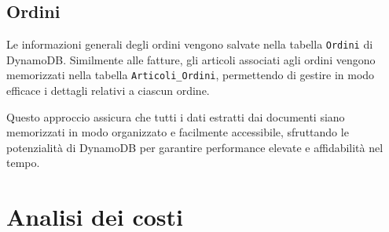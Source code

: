\subsection{Ordini}
Le informazioni generali degli ordini vengono salvate nella tabella \texttt{Ordini} di DynamoDB. Similmente alle fatture, gli articoli associati agli ordini vengono memorizzati nella tabella \texttt{Articoli\_Ordini}, permettendo di gestire in modo efficace i dettagli relativi a ciascun ordine.

Questo approccio assicura che tutti i dati estratti dai documenti siano memorizzati in modo organizzato e facilmente accessibile, sfruttando le potenzialità di DynamoDB per garantire performance elevate e affidabilità nel tempo.

\section{Analisi dei costi}
%
%
%
%
%
%
%
%
%
%
